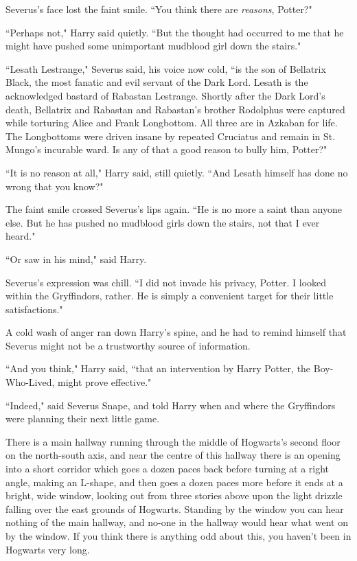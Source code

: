 Severus's face lost the faint smile. ``You think there are \emph{reasons}, Potter?"

``Perhaps not," Harry said quietly. ``But the thought had occurred to me that he might have pushed some unimportant mudblood girl down the stairs."

``Lesath Lestrange," Severus said, his voice now cold, ``is the son of Bellatrix Black, the most fanatic and evil servant of the Dark Lord. Lesath is the acknowledged bastard of Rabastan Lestrange. Shortly after the Dark Lord's death, Bellatrix and Rabastan and Rabastan's brother Rodolphus were captured while torturing Alice and Frank Longbottom. All three are in Azkaban for life. The Longbottoms were driven insane by repeated Cruciatus and remain in St. Mungo's incurable ward. Is any of that a good reason to bully him, Potter?"

``It is no reason at all," Harry said, still quietly. ``And Lesath himself has done no wrong that you know?"

The faint smile crossed Severus's lips again. ``He is no more a saint than anyone else. But he has pushed no mudblood girls down the stairs, not that I ever heard."

``Or saw in his mind," said Harry.

Severus's expression was chill. ``I did not invade his privacy, Potter. I looked within the Gryffindors, rather. He is simply a convenient target for their little satisfactions."

A cold wash of anger ran down Harry's spine, and he had to remind himself that Severus might not be a trustworthy source of information.

``And you think," Harry said, ``that an intervention by Harry Potter, the Boy-Who-Lived, might prove effective."

``Indeed," said Severus Snape, and told Harry when and where the Gryffindors were planning their next little game.

\later

There is a main hallway running through the middle of Hogwarts's second floor on the north-south axis, and near the centre of this hallway there is an opening into a short corridor which goes a dozen paces back before turning at a right angle, making an L-shape, and then goes a dozen paces more before it ends at a bright, wide window, looking out from three stories above upon the light drizzle falling over the east grounds of Hogwarts. Standing by the window you can hear nothing of the main hallway, and no-one in the hallway would hear what went on by the window. If you think there is anything odd about this, you haven't been in Hogwarts very long.

